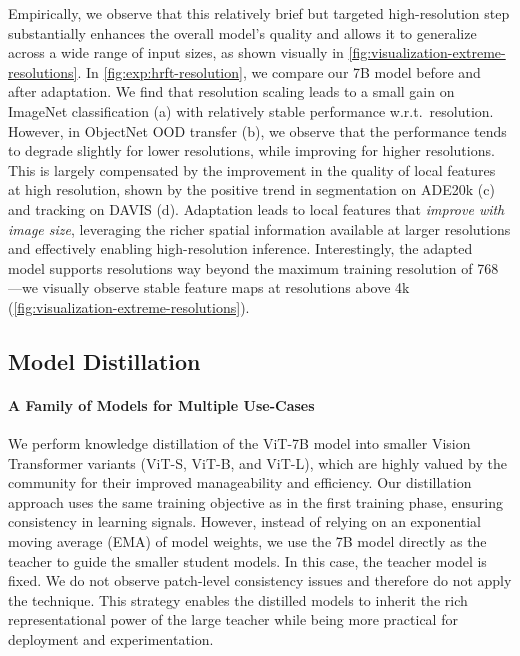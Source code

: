 Empirically, we observe that this relatively brief but targeted high-resolution step substantially enhances the overall model's quality and allows it to generalize across a wide range of input sizes, as shown visually in \cref{fig:visualization-extreme-resolutions}. 
In \cref{fig:exp:hrft-resolution}, we compare our 7B model before and after adaptation. 
We find that resolution scaling leads to a small gain on ImageNet classification (a) with relatively stable performance w.r.t.~resolution. 
However, in ObjectNet OOD transfer (b), we observe that the performance tends to degrade slightly for lower resolutions, while improving for higher resolutions. 
This is largely compensated by the improvement in the quality of local features at high resolution, shown by the positive trend in segmentation on ADE20k (c) and tracking on DAVIS (d).
Adaptation leads to local features that \emph{improve with image size}, leveraging the richer spatial information available at larger resolutions and effectively enabling high-resolution inference.
Interestingly, the adapted model supports resolutions way beyond the maximum training resolution of 768---we visually observe stable feature maps at resolutions above 4k (\cf \cref{fig:visualization-extreme-resolutions}).





\subsection{Model Distillation}
\label{sec:distillation}
\paragraph{A Family of Models for Multiple Use-Cases}
We perform knowledge distillation of the ViT-7B model into smaller Vision Transformer variants (ViT-S, ViT-B, and ViT-L), which are highly valued by the community for their improved manageability and efficiency. 
Our distillation approach uses the same training objective as in the first training phase, ensuring consistency in learning signals. 
However, instead of relying on an exponential moving average (EMA) of model weights, we use the 7B model directly as the teacher to guide the smaller student models. In this case, the teacher model is fixed. 
We do not observe patch-level consistency issues and therefore do not apply the \gramname technique.
This strategy enables the distilled models to inherit the rich representational power of the large teacher while being more practical for deployment and experimentation.

